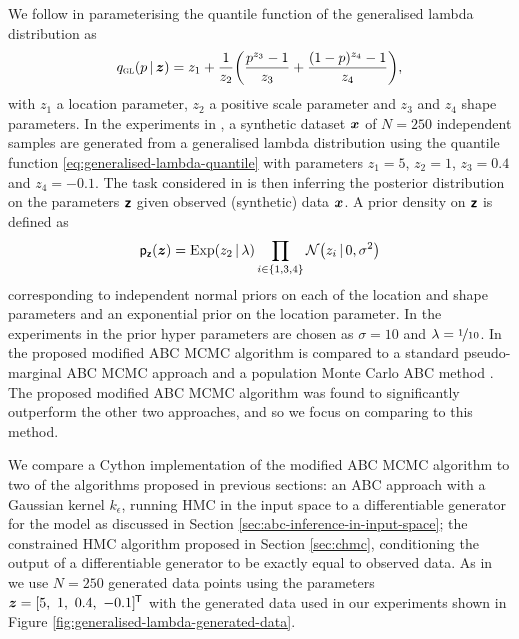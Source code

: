 We follow \citep{mcvinish2012improving} in parameterising the quantile function of the generalised lambda distribution as
\begin{equation}\label{eq:generalised-lambda-quantile}
  q_{\textsc{gl}}(p \gvn \vct{z}) = 
  z_1 + \frac{1}{z_2}\lpa \frac{p^{z_3} - 1}{z_3} + \frac{(1 - p)^{z_4} - 1}{z_4} \rpa,
\end{equation}
with $z_1$ a location parameter, $z_2$ a positive scale parameter and $z_3$ and $z_4$ shape parameters. In the experiments in \citep{mcvinish2012improving}, a synthetic dataset $\boldsymbol{x}$ of $N=250$ independent samples are generated from a generalised lambda distribution using the quantile function \eqref{eq:generalised-lambda-quantile} with parameters $z_1 = 5$, $z_2 = 1$, $z_3 = 0.4$ and $z_4 = -0.1$. The task considered in \citep{mcvinish2012improving} is then inferring the posterior distribution on the parameters $\boldsymbol{\mathsf{z}}$ given observed (synthetic) data $\boldsymbol{x}$. A prior density on $\boldsymbol{\mathsf{z}}$ is defined as
\begin{equation}\label{eq:generalised-lambda-param-prior}
  \pden{\rvct{z}}(\vct{z}) = \textrm{Exp}(z_2\gvn\lambda) \prod_{i \in \fset{1,3,4}} \nrm{z_i \gvn 0, \sigma^2}
\end{equation}
corresponding to independent normal priors on each of the location and shape parameters and an exponential prior on the location parameter. In the experiments in \citep{mcvinish2012improving} the prior hyper parameters are chosen as $\sigma = 10$ and $\lambda = \nicefrac{1}{10}$. In \citep{mcvinish2012improving} the proposed modified \ac{ABC} \ac{MCMC} algorithm is compared to a standard pseudo-marginal \ac{ABC} \ac{MCMC} approach and a population Monte Carlo \ac{ABC} method \citep{beaumont2009adaptive}. The proposed modified \ac{ABC} \ac{MCMC} algorithm was found to significantly outperform the other two approaches, and so we focus on comparing to this method.

We compare a Cython \citep{behnel2011cython} implementation of the modified \ac{ABC} \ac{MCMC} algorithm to two of the algorithms proposed in previous sections: an \ac{ABC} approach with a Gaussian kernel $k_\epsilon$, running \ac{HMC} in the input space to a differentiable generator for the model as discussed in Section \ref{sec:abc-inference-in-input-space}; the constrained \ac{HMC} algorithm proposed in Section \ref{sec:chmc}, conditioning the output of a differentiable generator to be exactly equal to observed data. As in \citep{mcvinish2012improving} we use $N=250$ generated data points using the parameters $\boldsymbol{z} = [5,~1,~0.4,~-0.1]^{\mkern-1.5mu\mathsf{T}}$ with the generated data used in our experiments shown in Figure \ref{fig:generalised-lambda-generated-data}. 

